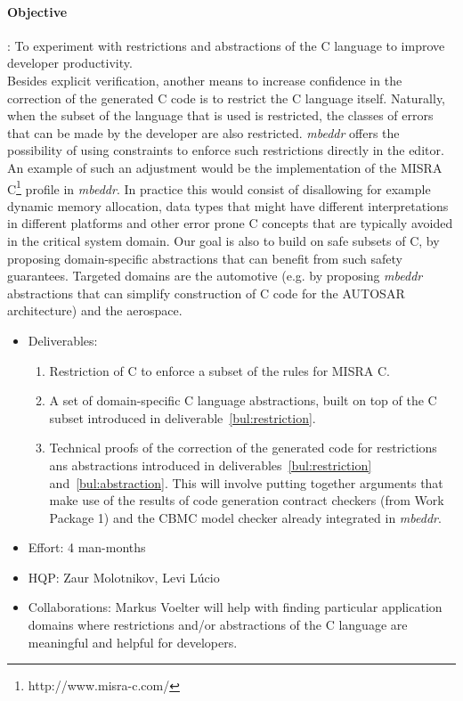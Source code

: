 \paragraph{\textbf{Objective}}: To experiment with restrictions and abstractions
of the C language to improve developer productivity.\vspace{.2cm}\\
Besides explicit verification, another means to increase confidence in the
correction of the generated C code is to restrict the C language itself.
Naturally, when the subset of the language that is used is restricted, the
classes of errors that can be made by the developer are also restricted.
\emph{mbeddr} offers the possibility of using constraints to enforce such
restrictions directly in the editor. An example of such an adjustment would be
the implementation of the MISRA C\footnote{http://www.misra-c.com/} profile in
\emph{mbeddr}.
In practice this would consist of disallowing for example dynamic memory
allocation, data types that might have different interpretations in different
platforms and other error prone C concepts that are typically avoided in the
critical system domain.
Our goal is also to build on safe subsets of C, by proposing domain-specific
abstractions that can benefit from such safety guarantees.
Targeted domains are the automotive (e.g. by proposing \emph{mbeddr} abstractions that can simplify
construction of C code for the AUTOSAR architecture) and the aerospace.

\begin{itemize}
  \item Deliverables:
  \begin{enumerate}
    \item\label{bul:restriction}Restriction of C to enforce a subset of the
    rules for MISRA C.
    \item\label{bul:abstraction} A set of domain-specific C language
    abstractions, built on top of the C subset introduced in
    deliverable~\ref{bul:restriction}.
\item Technical proofs of the correction of the generated code for restrictions
ans abstractions introduced in deliverables~\ref{bul:restriction}
and~\ref{bul:abstraction}.
This will involve putting together arguments that make use of the results of
code generation contract checkers (from Work Package 1) and the CBMC model checker already integrated in \emph{mbeddr}.
  \end{enumerate}
  \item Effort: 4 man-months
  \item HQP: Zaur Molotnikov, Levi L\'ucio
  \item Collaborations: Markus Voelter will help with finding
  particular application domains where restrictions and/or abstractions of the C
  language are meaningful and helpful for developers.
\end{itemize}